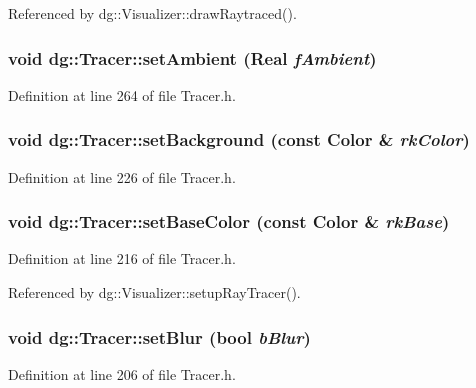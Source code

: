 Referenced by dg::Visualizer::draw\-Raytraced().
\subsubsection{\setlength{\rightskip}{0pt plus 5cm}void dg::Tracer::set\-Ambient ({\bf Real} {\em f\-Ambient})\hspace{0.3cm}{\tt  [inline]}}\label{classdg_1_1Tracer_a23}




Definition at line 264 of file Tracer.h.
\subsubsection{\setlength{\rightskip}{0pt plus 5cm}void dg::Tracer::set\-Background (const {\bf Color} \& {\em rk\-Color})\hspace{0.3cm}{\tt  [inline]}}\label{classdg_1_1Tracer_a20}




Definition at line 226 of file Tracer.h.
\subsubsection{\setlength{\rightskip}{0pt plus 5cm}void dg::Tracer::set\-Base\-Color (const {\bf Color} \& {\em rk\-Base})\hspace{0.3cm}{\tt  [inline]}}\label{classdg_1_1Tracer_a31}




Definition at line 216 of file Tracer.h.

Referenced by dg::Visualizer::setup\-Ray\-Tracer().
\subsubsection{\setlength{\rightskip}{0pt plus 5cm}void dg::Tracer::set\-Blur (bool {\em b\-Blur})\hspace{0.3cm}{\tt  [inline]}}\label{classdg_1_1Tracer_a18}




Definition at line 206 of file Tracer.h.

